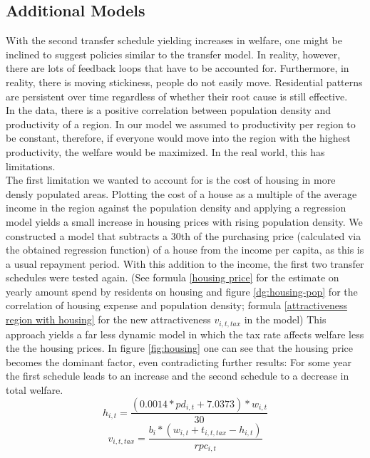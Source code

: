 \documentclass[10pt,a4paper]{article}
\begin{document}
\subsection{Additional Models}
With the second transfer schedule yielding increases in welfare, one might be inclined to suggest policies similar to the transfer model. In reality, however, there are lots of feedback loops that have to be accounted for. Furthermore, in reality, there is moving stickiness, people do not easily move. Residential patterns are persistent over time regardless of whether their root cause is still effective. \cite{heblich2021eastside}
\\
In the data, there is a positive correlation between population density and productivity of a region. In our model we assumed to productivity per region to be constant, therefore, if everyone would move into the region with the highest productivity, the welfare would be maximized. In the real world, this has limitations.
\\
The first limitation we wanted to account for is the cost of housing in more densly populated areas. Plotting the cost of a house as a multiple of the average income in the region against the population density and applying a regression model yields a small increase in housing prices with rising population density. We constructed a model that subtracts a 30th of the purchasing price (calculated via the obtained regression function) of a house from the income per capita, as this is a usual repayment period. With this addition to the income, the first two transfer schedules were tested again. (See formula \ref{housing price} for the estimate on yearly amount spend by residents on housing and figure \ref{dg:housing-pop} for the correlation of housing expense and population density; formula \ref{attractiveness region with housing} for the new attractiveness $v_{i,t,tax}$ in the model) This approach yields a far less dynamic model in which the tax rate affects welfare less the the housing prices. In figure \ref{fig:housing} one can see that the housing price becomes the dominant factor, even contradicting further results: For some year the first schedule leads to an increase and the second schedule to a decrease in total welfare.
\\
\begin{equation}
    h_{i,t} = \frac{(0.0014*pd_{i,t}+7.0373) * w_{i,t}}{30}
    \label{housing price}
\end{equation}
\begin{equation}
    v_{i,t,tax} = \frac{b_i*(w_{i,t}+t_{i,t,tax}-h_{i,t})}{rpc_{i,t}}
    \label{attractiveness region with housing}
\end{equation}
\end{document}
